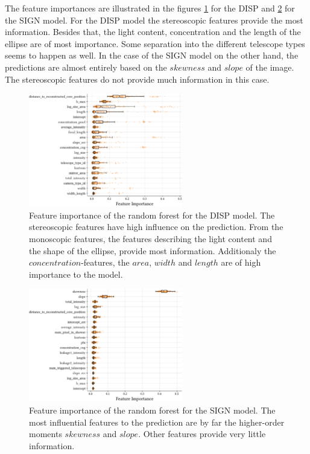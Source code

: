 The feature importances are illustrated in the figures \ref{fig:disp_features}
for the DISP and \ref{fig:sign_features} for the SIGN model.
For the DISP model the stereoscopic features provide the most information.
Besides that, the light content, concentration and the length of the ellipse
are of most importance. Some separation into the different telescope types
seems to happen as well.
In the case of the SIGN model on the other hand, the predictions are almost
entirely based on the $skewness$ and $slope$ of the image.
The stereoscopic features do not provide much information in this case.

\begin{figure}
	\centering
    \captionsetup{width=0.9\linewidth}
	\hspace*{-0.11\textwidth}\includegraphics[width=0.6\textwidth]{../analysis/plots/disp_features.pdf}
	\caption{
	    Feature importance of the random forest for the DISP model.
	    The stereoscopic features have high influence on the prediction.
    	From the monoscopic features, the features describing the light content and the
        shape of the ellipse, provide most information.
        Additionaly the $concentration$-features, the $area$, $width$ and $length$
        are of high importance to the model.}
	\label{fig:disp_features}
\end{figure}

\begin{figure}
	\centering
    \captionsetup{width=0.9\linewidth}
	\hspace*{-0.1\textwidth}\includegraphics[width=0.6\textwidth]{../analysis/plots/sign_features.pdf}
	\caption{Feature importance of the random forest for the SIGN model.
	        The most influential features to the prediction are by far the higher-order moments $skewness$
            and $slope$. Other features provide very little information.}
	\label{fig:sign_features}
\end{figure}

